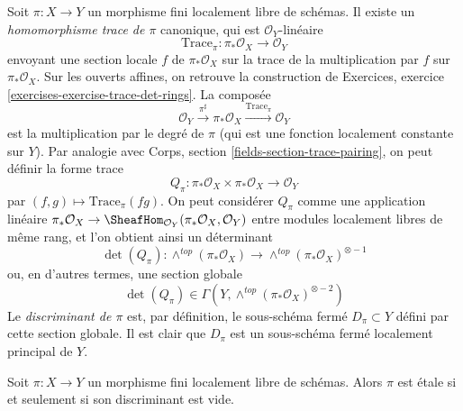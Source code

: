 \medskip\noindent
Soit $\pi : X \to Y$ un morphisme fini localement
libre de schémas. Il existe un {\it homomorphisme trace de $\pi$} canonique,
qui est $\mathcal{O}_Y$-linéaire
$$
\text{Trace}_\pi : \pi_*\mathcal{O}_X \longrightarrow \mathcal{O}_Y
$$
envoyant une section locale $f$ de $\pi_*\mathcal{O}_X$ sur la
trace de la multiplication par $f$ sur $\pi_*\mathcal{O}_X$. Sur les
ouverts affines, on retrouve la construction de
Exercices, exercice \ref{exercises-exercise-trace-det-rings}.
La composée
$$
\mathcal{O}_Y \xrightarrow{\pi^\sharp} \pi_*\mathcal{O}_X
\xrightarrow{\text{Trace}_\pi} \mathcal{O}_Y
$$
est la multiplication par le degré de $\pi$ (qui est une fonction localement constante
sur $Y$). Par analogie avec
Corps, section \ref{fields-section-trace-pairing},
on peut définir la forme trace
$$
Q_\pi :
\pi_*\mathcal{O}_X \times \pi_*\mathcal{O}_X
\longrightarrow
\mathcal{O}_Y
$$
par $(f, g) \mapsto \text{Trace}_\pi(fg)$. On peut considérer
$Q_\pi$ comme une application linéaire
$\pi_*\mathcal{O}_X \to
\SheafHom_{\mathcal{O}_Y}(\pi_*\mathcal{O}_X, \mathcal{O}_Y)$
entre modules localement libres de même rang, et l'on obtient ainsi
un déterminant
$$
\det(Q_\pi) :
\wedge^{top}(\pi_*\mathcal{O}_X)
\longrightarrow
\wedge^{top}(\pi_*\mathcal{O}_X)^{\otimes -1}
$$
ou, en d'autres termes, une section globale
$$
\det(Q_\pi) \in \Gamma(Y, \wedge^{top}(\pi_*\mathcal{O}_X)^{\otimes -2})
$$
Le {\it discriminant de $\pi$} est, par définition, le sous-schéma
fermé $D_\pi \subset Y$ défini par cette section globale.
Il est clair que $D_\pi$ est un sous-schéma fermé localement principal de $Y$.

\begin{lemma}
\label{lemma-discriminant}
Soit $\pi : X \to Y$ un morphisme fini localement
libre de schémas. Alors $\pi$ est étale si et seulement si son discriminant est vide.
\end{lemma}


